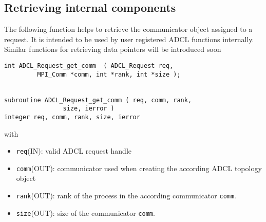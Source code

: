 %
%

\subsection{Retrieving internal components}

The following function helps to retrieve the communicator object assigned to a
request. It is intended to be used by user registered ADCL functions
internally. Similar functions for retrieving data pointers will be introduced
soon

\begin{verbatim}
int ADCL_Request_get_comm  ( ADCL_Request req, 
         MPI_Comm *comm, int *rank, int *size );


subroutine ADCL_Request_get_comm ( req, comm, rank,
                size, ierror )
integer req, comm, rank, size, ierror     
\end{verbatim}
with
\begin{itemize}
\item {\tt req}(IN): valid ADCL request handle
\item {\tt comm}(OUT): communicator used when creating the according ADCL topology object
\item {\tt rank}(OUT): rank of the process in the according communicator {\tt comm}.
\item {\tt size}(OUT): size of the communicator {\tt comm}.
\end{itemize}
\hspace{1cm}

